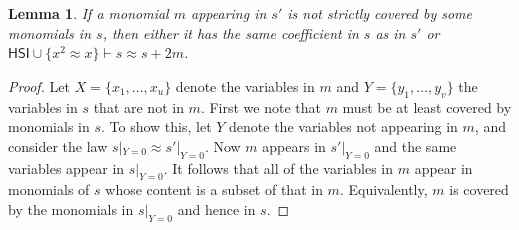 \documentclass[eqnor,reqno]{amsart}
\theoremstyle{plain}
\newtheorem{lem}[thm]{Lemma}
\theoremstyle{definition}
\newcommand{\HSI}{\textsf{HSI}}
\begin{document}
\begin{lem}\label{lem:canincreasemod2}
If a monomial $m$ appearing in $s'$ is not strictly covered by some monomials in $s$, then either it has the same coefficient in $s$ as in $s'$ or  $\HSI\cup\{x^2\approx x\}\vdash s\approx s+2m$.
\end{lem}
\begin{proof}
Let $X=\{x_1,\dots,x_u\}$ denote the variables in $m$ and $Y=\{y_1,\dots,y_v\}$ the variables in $s$ that are not in $m$.
First we note that $m$ must be at least covered by monomials in $s$.  
To show this, let $Y$ denote the variables not appearing in $m$, and consider the law $s|_{Y=0}\approx s'|_{Y=0}$.  
Now $m$ appears in $s'|_{Y=0}$ and the same variables appear in  $s|_{Y=0}$. 
It follows that all of the variables in $m$ appear in monomials of $s$ whose content is a subset of that in $m$.
Equivalently, $m$ is covered by the monomials in $s|_{Y=0}$ and hence in $s$.


\end{proof}
\end{document}
